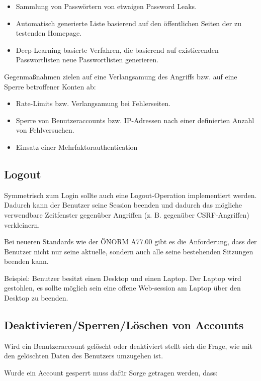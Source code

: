 \begin{itemize}
	\item Sammlung von Passwörtern von etwaigen Password Leaks.
	\item Automatisch generierte Liste basierend auf den öffentlichen Seiten der zu testenden Homepage.
	\item Deep-Learning basierte Verfahren, die basierend auf existierenden Passwortlisten neue Passwortlisten generieren.
\end{itemize}

Gegenmaßnahmen zielen auf eine Verlangsamung des Angriffs bzw. auf eine Sperre betroffener Konten ab:

\begin{itemize}
	\item Rate-Limits bzw. Verlangsamung bei Fehlerseiten.
	\item Sperre von Benutzeraccounts bzw. IP-Adressen nach einer definierten Anzahl von Fehlversuchen.
	\item Einsatz einer Mehrfaktorauthentication
\end{itemize}

\subsection{Logout}

Symmetrisch zum Login sollte auch eine Logout-Operation implementiert werden. Dadurch kann der Benutzer seine Session beenden und dadurch das mögliche verwendbare Zeitfenster gegenüber Angriffen (z. B. gegenüber CSRF-Angriffen) verkleinern.

Bei neueren Standards wie der ÖNORM A77.00 gibt es die Anforderung, dass der Benutzer nicht nur seine aktuelle, sondern auch alle seine bestehenden Sitzungen beenden kann.

Beispiel: Benutzer besitzt einen Desktop und einen Laptop. Der Laptop wird gestohlen, es sollte möglich sein eine offene Web-session am Laptop über den Desktop zu beenden.

\subsection{Deaktivieren/Sperren/Löschen von Accounts}

Wird ein Benutzeraccount gelöscht oder deaktiviert stellt sich die Frage, wie mit den gelöschten Daten des Benutzers umzugehen ist.

Wurde ein Account gesperrt muss dafür Sorge getragen werden, dass:


